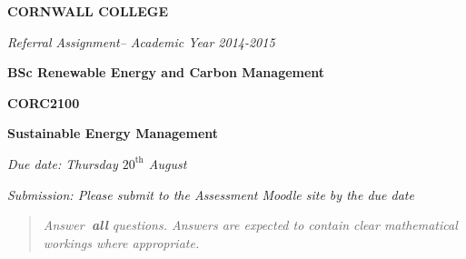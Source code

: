 \documentclass[a4paper,12pt,fleqn]{article}
\newcommand{\institution}{CORNWALL COLLEGE}
\newcommand{\titlehd}{BSc Renewable Energy and Carbon Management}
\newcommand{\examtype}{Referral Assignment}
\newcommand{\examdate}{Academic Year 2014-2015}
\newcommand{\examcode}{CORC2100}
\newcommand{\examtitle}{Sustainable Energy Management}
\newcommand{\readtime}{15 Minutes}
\newcommand{\duedate}{Thursday $20^{\mathrm{th}}$ August}
\newcommand{\submission}{Please submit to the Assessment Moodle site by the due date}
\begin{document}

\begin{center}
\large\textbf{\institution}
\end{center}
\vspace{1cm}

\begin{center}
\textit{ \examtype -- \examdate}
\end{center}
\vspace{1cm}

\begin{center}
\large\textbf{\titlehd}
\end{center}

\begin{center}
\large\textbf{\examcode}
\end{center}
\begin{center}
\large\textbf{\examtitle}
\end{center}
\vspace{4cm}
\vspace{4cm}

\begin{center}
\end{center}
\begin{center}
\textit{Due date:  \duedate}
\end{center}
\begin{center}
\textit{Submission:  \submission}
\end{center}






\newpage
\begin{quote}
\textit{Answer\textbf{\ all} questions.  Answers are expected to contain clear mathematical workings where appropriate.}
\end{quote}

\bigskip
\end{document}
